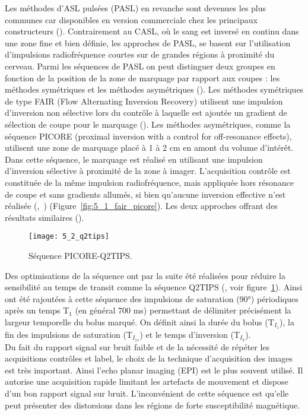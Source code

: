 Les méthodes d’ASL pulsées (PASL) en revanche sont devenues les plus communes car disponibles en version commerciale chez les principaux constructeurs (\cite{Petersen2006}). Contrairement au CASL, où le sang est inversé en continu dans une zone fine et bien définie, les approches de PASL, se basent sur l’utilisation d’impulsions radiofréquence courtes sur de grandes régions à proximité du cerveau. Parmi les séquences de PASL on peut distinguer deux groupes en fonction de la position de la zone de marquage par rapport aux coupes : les méthodes symétriques et les méthodes asymétriques (\cite{Petersen2006}). Les méthodes symétriques de type FAIR (Flow Alternating Inversion Recovery) utilisent une impulsion d’inversion non sélective lors du contrôle à laquelle est ajoutée un gradient de sélection de coupe pour le marquage (\cite{Wong1997}).  Les méthodes asymétriques, comme la séquence PICORE (proximal inversion with a control for off-resonance effects), utilisent une zone de marquage placé à 1 à 2 cm en amont du volume d’intérêt. Dans cette séquence, le marquage est réalisé en utilisant une impulsion d’inversion sélective à proximité de la zone à imager. L’acquisition contrôle est constituée de la même impulsion radiofréquence, mais appliquée hors résonance de coupe et sans gradients allumés, si bien qu’aucune inversion effective n’est réalisée (\cite{Wong1997},~\cite{Buxton2009}) (Figure~\ref{fig:5_1_fair_picore}). Les deux approches offrant des résultats similaires (\cite{Cavusoglu2009}).\\
\begin{figure}[!t]
\centering
\texttt{[image: 5\_2\_q2tips]}
\caption{Séquence PICORE-Q2TIPS.}
\label{fig:5_2_q2tips}	
\end{figure}
Des optimisations de la séquence ont par la suite été réalisées pour réduire la sensibilité au temps de transit comme la séquence Q2TIPS (\cite{Luh1999}, voir figure~\ref{fig:5_2_q2tips}). Ainsi ont été rajoutées à cette séquence des impulsions de saturation (90°) périodiques après un temps T$_1$ (en général 700 ms) permettant de délimiter précisément la largeur temporelle du bolus marqué. On définit ainsi la durée du bolus (T$_{I_1}$), la fin des impulsions de saturation (T$_{I_{1s}}$) et le temps d’inversion (T$_{I_2}$).\\
Du fait du rapport signal sur bruit faible et de la nécessité de répéter les acquisitions contrôles et label, le choix de la technique d’acquisition des images est très important. Ainsi l’echo planar imaging (EPI) est le plus souvent utilisé. Il autorise une acquisition rapide limitant les artefacts de mouvement et dispose d’un bon rapport signal sur bruit. L’inconvénient de cette séquence est qu’elle peut présenter des distorsions dans les régions de forte susceptibilité magnétique. \\
